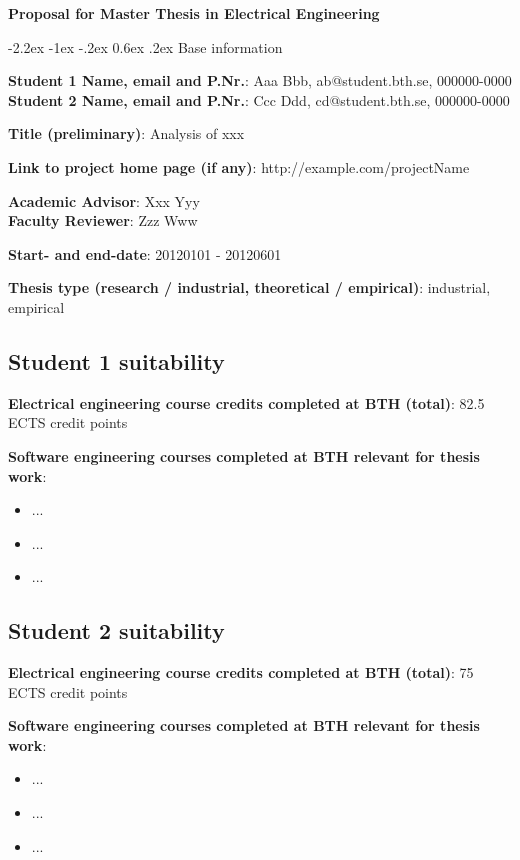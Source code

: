 \documentclass[10pt,english,a4paper]{article}
\makeatletter
\newcommand{\emptyLine}{
	\vspace{16pt}
}
\newcommand{\bthProposalTitle}[1]{
	\noindent\textbf{\Large{#1}}
}
\renewcommand\section{
	\@startsection {section}{1}{\z@}%
		{-2.2ex \@plus -1ex \@minus -.2ex}%
		{0.6ex \@plus.2ex}%
		{\itshape\large\bfseries}
}
\makeatother
\begin{document}
\bthProposalTitle{Proposal for Master Thesis in Electrical Engineering}

\section{Base information}

\noindent
\textbf{Student 1 Name, email and P.Nr.}: Aaa Bbb, ab@student.bth.se, 000000-0000 \\
\textbf{Student 2 Name, email and P.Nr.}: Ccc Ddd, cd@student.bth.se, 000000-0000  
\emptyLine{}

\noindent\textbf{Title (preliminary)}: Analysis of xxx
\emptyLine{}

\noindent\textbf{Link to project home page (if any)}: http://example.com/projectName
\emptyLine{}

\noindent
\textbf{Academic Advisor}: Xxx Yyy \\
\textbf{Faculty Reviewer}:  Zzz Www
\emptyLine{}

\noindent\textbf{Start- and end-date}: 20120101 - 20120601
\emptyLine{}

\noindent\textbf{Thesis type (research / industrial, theoretical / empirical)}: industrial, empirical
\emptyLine{}

\subsection*{Student 1 suitability}
\noindent\textbf{Electrical engineering course credits completed at BTH (total)}: 82.5 ECTS credit points
\emptyLine{}

\noindent\textbf{Software engineering courses completed at BTH relevant for thesis work}:
\begin{itemize}\itemsep=-2pt
\item{...}
\item{...}
\item{...}
\end{itemize}


\subsection*{Student 2 suitability}
\noindent\textbf{Electrical engineering course credits completed at BTH (total)}: 75 ECTS credit points
\emptyLine{}

\noindent\textbf{Software engineering courses completed at BTH relevant for thesis work}:
\begin{itemize}\itemsep=-2pt
\item{...}
\item{...}
\item{...}
\end{itemize}
\end{document}
